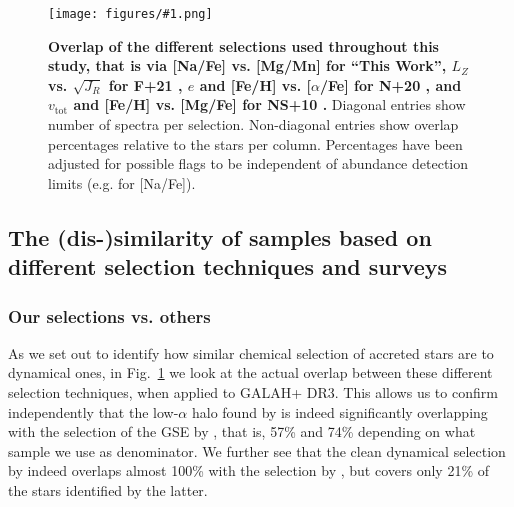 \documentclass[fleqn,usenatbib]{mnras}
\newcommand{\codeicon}{{\faCloudDownload}}
\newcommand{\codelink}[1]{\href{https://github.com/svenbuder/Accreted-stars-in-GALAH-DR3/tree/main/figures/#1.ipynb}{\codeicon}\,\,}
\newcommand{\oscaption}[2]{\caption{#2 \codelink{#1}}}
\newcommand{\figurecolumnwidth}[3]{\begin{figure} \centering \texttt{[image: figures/\#1.png]}\oscaption{#2}{#3}\label{fig:#1} \end{figure}}
\begin{document}
\figurecolumnwidth{selection_overlap}{chronochemodynamic_comparison}{
\textbf{Overlap of the different selections used throughout this study, that is via [Na/Fe] vs. [Mg/Mn] for ``This Work'', $L_Z$ vs. $\sqrt{J_R}$ for F+21 \citep{Feuillet2021}, $e$ and [Fe/H] vs. [$\alpha$/Fe] for N+20 \citep{Naidu2020}, and $v_\text{tot}$ and [Fe/H] vs. [Mg/Fe] for NS+10 \citep{Nissen2010}.} Diagonal entries show number of spectra per selection. Non-diagonal entries show overlap percentages relative to the stars per column. Percentages have been adjusted for possible flags to be independent of abundance detection limits (e.g. for [Na/Fe]). 
}

\subsection{The (dis-)similarity of samples based on different selection techniques and surveys} \label{sec:dissimilarity}

\subsubsection{Our selections vs. others}

As we set out to identify how similar chemical selection of accreted stars are to dynamical ones, in Fig.~\ref{fig:selection_overlap} we look at the actual overlap between these different selection techniques, when applied to GALAH+ DR3. This allows us to confirm independently that the low-$\alpha$ halo found by \citet{Nissen2010} is indeed significantly overlapping with the selection of the GSE by \citet{Naidu2020}, that is, 57\% and 74\% depending on what sample we use as denominator. We further see that the clean dynamical selection by \citet{Feuillet2021} indeed overlaps almost 100\% with the selection by \citet{Naidu2020}, but covers only 21\% of the stars identified by the latter.
\end{document}
